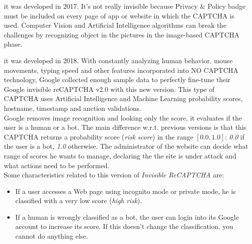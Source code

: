 \begin{itemize}
{\begin{itemize}
{it was developed in 2017. It's not really invisible because Privacy \& Policy badge must be included on every page of app or website in which the CAPTCHA is used. Computer Vision and Artificial Intelligence algorithms can break the challenges by recognizing object in the pictures in the image-based CAPTCHA phase.}
{it was developed in 2018. With constantly analyzing human behavior, mouse movements, typing speed and other features incorporated into NO CAPTCHA technology, Google collected enough sample data to perfectly fine-tune their Google invisible reCAPTCHA v2.0 with this new version. This type of CAPTCHA uses Artificial Intelligence and Machine Learning probability scores, hostname, timestamp and anction validations.\\
Google removes image recognition and looking only the score, it evaluates if the user is a human or a bot. The main difference w.r.t. previous versions is that this CAPTCHA returns a probability score (\textit{risk score}) in the range $[0.0, 1.0]$: \textit{0.0} if the user is a bot, \textit{1.0} otherwise. The administrator of the website can decide what range of scores he wants to manage, declaring the the site is under attack and what actions need to be performed.\\
Some characteristics related to this version of \textit{Invisible ReCAPTCHA} are:
\begin{itemize}
\item{If a user accesses a Web page using incognito mode or private mode, he is classified with a very low score (\textit{high risk}).}
\item{If a human is wrongly classified as a bot, the user can login into its Google account to increase its score. If this doesn't change the classification, you cannot do anything else.}
\end{itemize}
}
\end{itemize}
}
\end{itemize}

